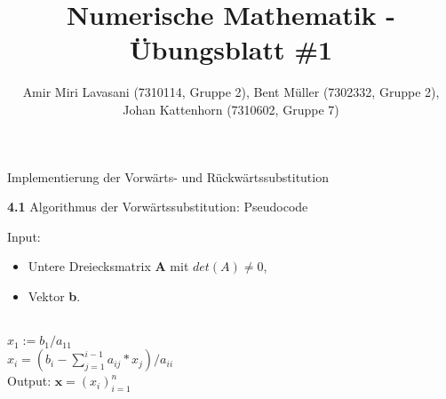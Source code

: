 \documentclass[10pt]{article}
\newenvironment{Aufgabe}[2][Aufgabe]{\begin{trivlist}
\item[\hskip \labelsep {\bfseries #1}\hskip \labelsep {\bfseries #2.}]}{\end{trivlist}}
\begin{document}
 
\title{ \textbf{Numerische Mathematik - Übungsblatt \#1} }

\author{Amir Miri Lavasani (7310114, Gruppe 2), Bent Müller (7302332, Gruppe 2), \\ 
Johan Kattenhorn (7310602, Gruppe 7)} \maketitle

 
\begin{Aufgabe}{4}
	Implementierung der Vorwärts- und Rückwärtssubstitution
\end{Aufgabe}

\textbf{4.1} Algorithmus der Vorwärtssubstitution: Pseudocode \\

\begin{algorithmic}
	\State Input: 
		\begin{itemize}
			\item Untere Dreiecksmatrix \textbf{A} mit $det(A) \neq 0$,
			\item Vektor \textbf{b}. 
		\end{itemize} \\
	\State $x_1 := b_1/a_{11}$ \\
		\State $x_i = (b_i-\sum_{j=1}^{i-1}a_{ij}*x_j)/a_{ii}$ 
	\EndFor \\

	\State Output: $\textbf{x} = (x_i)_{i=1}^{n}$

\end{algorithmic}
\end{document}
